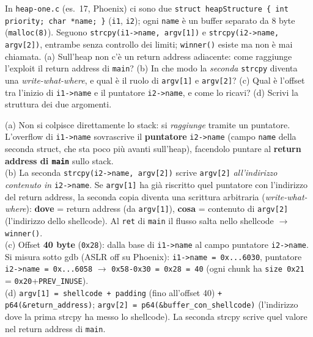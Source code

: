 \question[8]
In \lstinline|heap-one.c| (es.\ 17, Phoenix) ci sono due \lstinline|struct heapStructure { int priority; char *name; }| (\lstinline|i1|, \lstinline|i2|); ogni \lstinline|name| è un buffer separato da 8 byte (\lstinline|malloc(8)|). Seguono \lstinline|strcpy(i1->name, argv[1])| e \lstinline|strcpy(i2->name, argv[2])|, entrambe senza controllo dei limiti; \lstinline|winner()| esiste ma non è mai chiamata.
(a) Sull'heap non c'è un return address adiacente: come raggiunge l'exploit il return address di \lstinline|main|? (b) In che modo la \emph{seconda} \lstinline|strcpy| diventa una \emph{write-what-where}, e qual è il ruolo di \lstinline|argv[1]| e \lstinline|argv[2]|? (c) Qual è l'offset tra l'inizio di \lstinline|i1->name| e il puntatore \lstinline|i2->name|, e come lo ricavi? (d) Scrivi la struttura dei due argomenti.
\begin{solution}
(a) Non si colpisce direttamente lo stack: si \emph{raggiunge} tramite un puntatore. L'overflow di \lstinline|i1->name| sovrascrive il \textbf{puntatore} \lstinline|i2->name| (campo \lstinline|name| della seconda struct, che sta poco più avanti sull'heap), facendolo puntare al \textbf{return address di \lstinline|main|} sullo stack.\\
(b) La seconda \lstinline|strcpy(i2->name, argv[2])| scrive \lstinline|argv[2]| \emph{all'indirizzo contenuto in} \lstinline|i2->name|. Se \lstinline|argv[1]| ha già riscritto quel puntatore con l'indirizzo del return address, la seconda copia diventa una scrittura arbitraria (\emph{write-what-where}): \textbf{dove} = return address (da \lstinline|argv[1]|), \textbf{cosa} = contenuto di \lstinline|argv[2]| (l'indirizzo dello shellcode). Al \lstinline|ret| di \lstinline|main| il flusso salta nello shellcode $\to$ \lstinline|winner()|.\\
(c) Offset \textbf{40 byte} (\lstinline|0x28|): dalla base di \lstinline|i1->name| al campo puntatore \lstinline|i2->name|. Si misura sotto gdb (ASLR off su Phoenix): \lstinline|i1->name = 0x...6030|, puntatore \lstinline|i2->name = 0x...6058| $\to$ \lstinline|0x58-0x30 = 0x28 = 40| (ogni chunk ha \lstinline|size 0x21| = \lstinline|0x20|+\lstinline|PREV_INUSE|).\\
(d) \lstinline|argv[1] = shellcode + padding| (fino all'offset 40) \lstinline|+ p64(&return_address)|; \lstinline|argv[2] = p64(&buffer_con_shellcode)| (l'indirizzo dove la prima strcpy ha messo lo shellcode). La seconda strcpy scrive quel valore nel return address di \lstinline|main|.
\end{solution}
